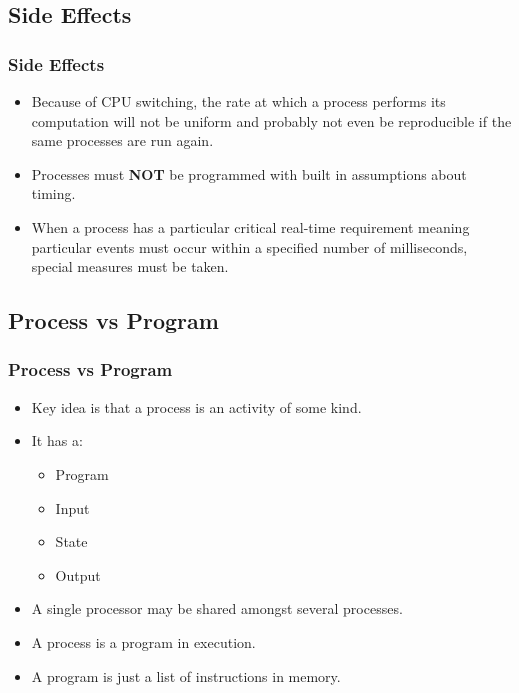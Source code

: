\documentclass{beamer}
\begin{document}
\subsection{Side Effects}
\begin{frame}
\frametitle{Side Effects}
\begin{itemize}
\item Because of CPU switching, the rate at which a process performs its computation will not be uniform and probably not even be reproducible if the same processes are run again.
\item Processes must \textbf{NOT} be programmed with built in assumptions about timing.
\item When a process has a particular critical real-time requirement meaning particular events must occur within a specified number of milliseconds, special measures must be taken.
\end{itemize}
\end{frame}
\subsection{Process vs Program}
\begin{frame}
\frametitle{Process vs Program}
\begin{itemize}
\item Key idea is that a process is an activity of some kind.
\item It has a:
\begin{itemize}
\item Program
\item Input
\item State
\item Output
\end{itemize}
\item A single processor may be shared amongst several processes.
\item A process is a program in execution.
\item A program is just a list of instructions in memory.
\end{itemize}
\end{frame}
\end{document}
